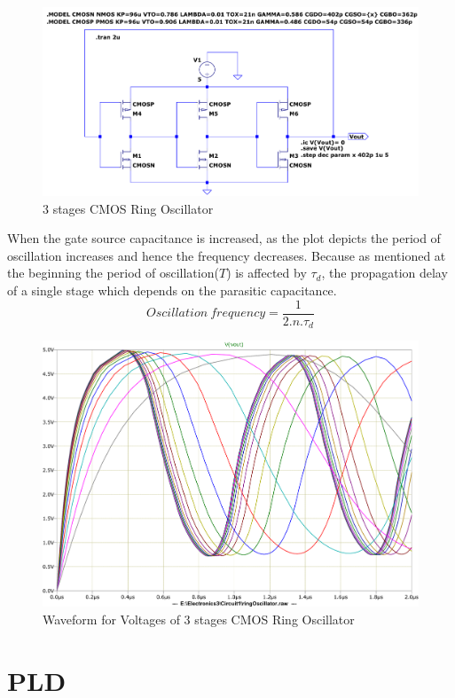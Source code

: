 \documentclass[a4paper,11pt]{article}%
\begin{document}
\begin{figure}[H]
	\centering
	\includegraphics[scale=0.6]{figures/cct1plot1}
	\caption{3 stages CMOS Ring Oscillator}
\end{figure}
\pagebreak
When the gate source capacitance is increased, as the plot depicts the period of oscillation increases and hence the frequency decreases. Because as mentioned at the beginning the period of oscillation($T$) is affected by $\tau_{d}$, the propagation delay of a single stage which depends on the parasitic capacitance. 
\[
Oscillation~frequency = \frac{1}{2.n.\tau_{d}}
\]

\begin{figure}[H]
	\centering
	\includegraphics[scale=0.5]{figures/cct1plot2}
	\caption{Waveform for Voltages of 3 stages CMOS Ring Oscillator}
\end{figure}


\pagebreak
\section{PLD}
\end{document}
